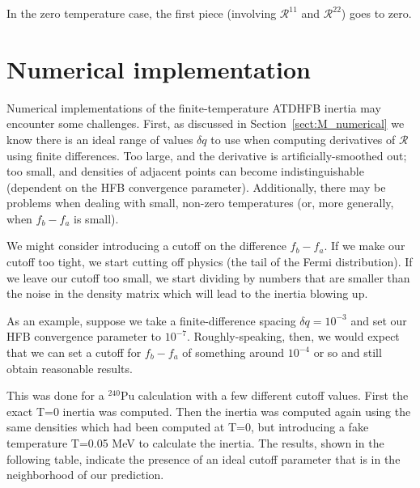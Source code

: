 \noindent In the zero temperature case, the first piece (involving $\mathcal{R}^{11}$ and $\mathcal{R}^{22}$) goes to zero.

\section{Numerical implementation}

Numerical implementations of the finite-temperature ATDHFB inertia may encounter some challenges. First, as discussed in Section~\ref{sect:M_numerical} we know there is an ideal range of values $\delta q$ to use when computing derivatives of $\mathcal{R}$ using finite differences. Too large, and the derivative is artificially-smoothed out; too small, and densities of adjacent points can become indistinguishable (dependent on the HFB convergence parameter). Additionally, there may be problems when dealing with small, non-zero temperatures (or, more generally, when $f_b-f_a$ is small).
%
%

We might consider introducing a cutoff on the difference $f_b-f_a$. If we make our cutoff too tight, we start cutting off physics (the tail of the Fermi distribution). If we leave our cutoff too small, we start dividing by numbers that are smaller than the noise in the density matrix which will lead to the inertia blowing up.

As an example, suppose we take a finite-difference spacing $\delta q = 10^{-3}$ and set our HFB convergence parameter to $10^{-7}$. Roughly-speaking, then, we would expect that we can set a cutoff for $f_b-f_a$ of something around $10^{-4}$ or so and still obtain reasonable results.

This was done for a $^{240}$Pu calculation with a few different cutoff values. First the exact T=0 inertia was computed. Then the inertia was computed again using the same densities which had been computed at T=0, but introducing a fake temperature T=0.05 MeV to calculate the inertia. The results, shown in the following table, indicate the presence of an ideal cutoff parameter that is in the neighborhood of our prediction.

